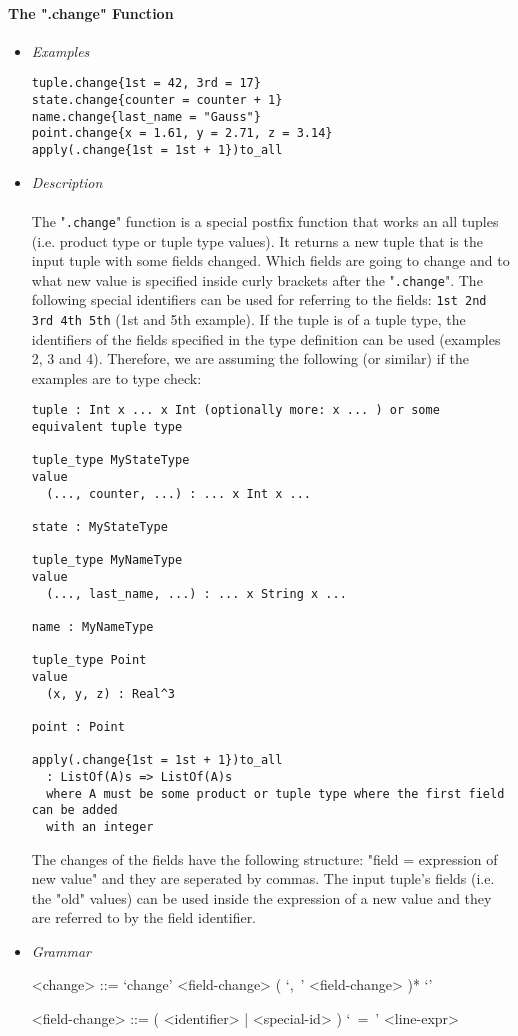 \documentclass{article}
\begin{document}
\paragraph{The ".change" Function}

\begin{itemize}

\item \textit{Examples}

\begin{verbatim}
tuple.change{1st = 42, 3rd = 17}
state.change{counter = counter + 1} 
name.change{last_name = "Gauss"}
point.change{x = 1.61, y = 2.71, z = 3.14}
apply(.change{1st = 1st + 1})to_all
\end{verbatim}

\item \textit{Description} \\\\
The "\texttt{.change}" function is a special postfix function that works an all
tuples (i.e. product type or tuple type values). It returns a new tuple that is
the input tuple with some fields changed. Which fields are going to change and
to what new value is specified inside curly brackets after the
"\texttt{.change}". The following special identifiers can be used for referring
to the fields: \texttt{1st 2nd 3rd 4th 5th} (1st and 5th example). If the tuple
is of a tuple type, the identifiers of the fields specified in the type
definition can be used (examples 2, 3 and 4). Therefore, we are assuming the
following (or similar) if the examples are to type check:

\begin{verbatim}
tuple : Int x ... x Int (optionally more: x ... ) or some equivalent tuple type

tuple_type MyStateType
value
  (..., counter, ...) : ... x Int x ...

state : MyStateType

tuple_type MyNameType
value
  (..., last_name, ...) : ... x String x ...

name : MyNameType

tuple_type Point
value
  (x, y, z) : Real^3

point : Point

apply(.change{1st = 1st + 1})to_all
  : ListOf(A)s => ListOf(A)s
  where A must be some product or tuple type where the first field can be added 
  with an integer
\end{verbatim}
The changes of the fields have the following structure: "field = expression of
new value" and they are seperated by commas. The input tuple's fields (i.e. the
"old" values) can be used inside the expression of a new value and they are
referred to by the field identifier.
\item \textit{Grammar}

\begin{grammar}
<change> ::= `change{' <field-change> ( `,\ ' <field-change> )* `}'

<field-change> ::= ( <identifier> | <special-id> ) `\ =\ ' <line-expr>
\end{grammar} 

\end{itemize}
\end{document}
